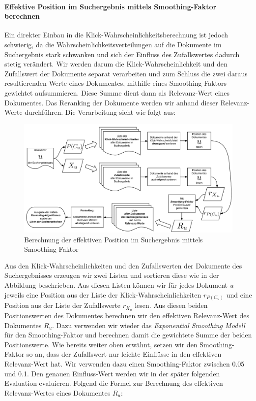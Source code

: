 \paragraph{Effektive Position im Suchergebnis mittels Smoothing-Faktor berechnen} 
Ein direkter Einbau in die Klick-Wahrscheinlichkeitsberechnung ist jedoch schwierig, da die Wahrscheinlichkeitsverteilungen auf die Dokumente im Suchergebnis stark schwanken und sich der Einfluss des Zufallswertes dadurch stetig verändert. Wir werden darum die Klick-Wahrscheinlichkeit und den Zufallswert der Dokumente separat verarbeiten und zum Schluss die zwei daraus resultierenden Werte eines Dokumentes, mithilfe eines Smoothing-Faktors gewichtet aufsummieren. Diese Summe dient dann als Relevanz-Wert eines Dokumentes. Das Reranking der Dokumente werden wir anhand dieser Relevanz-Werte durchführen. Die Verarbeitung sieht wie folgt aus:

\begin{figure}[H]
\centering
\vspace{-1em}
\caption[Berechnung der effektiven Position im Suchergebnis mittels Smoothing-Faktor]{Berechnung der effektiven Position im Suchergebnis mittels Smoothing-Faktor}
\label{fig:BerechnungRerankedPosition}
\includegraphics[width=\linewidth]{gfx/BerechnungRerankedPosition}
\vspace{-2.5em}
\end{figure}

Aus den Klick-Wahrscheinlichkeiten und den Zufallswerten der Dokumente des Suchergebnisses erzeugen wir zwei Listen und sortieren diese wie in der Abbildung beschrieben. Aus diesen Listen können wir für jedes Dokument $u$ jeweils eine Position aus der Liste der Klick-Wahrscheinlichkeiten $r_{P(C_{u})}$ und eine Position aus der Liste der Zufallswerte $r_{X_{u}}$ lesen. Aus diesen beiden Positionswerten des Dokumentes berechnen wir den effektiven Relevanz-Wert des Dokumentes $R_{u}$. Dazu verwenden wir wieder das \textit{Exponential Smoothing Modell} für den Smoothing-Faktor und berechnen damit die gewichtete Summe der beiden Positionswerte. Wie bereits weiter oben erwähnt, setzen wir den Smoothing-Faktor so an, dass der Zufallswert nur leichte Einflüsse in den effektiven Relevanz-Wert hat. Wir verwenden dazu einen Smoothing-Faktor zwischen 0.05 und 0.1. Den genauen Einfluss-Wert werden wir in der später folgenden Evaluation evaluieren. Folgend die Formel zur Berechnung des effektiven Relevanz-Wertes eines Dokumentes $R_{u}$:

